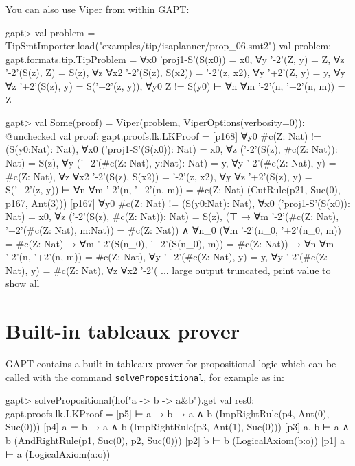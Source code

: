 \documentclass[a4paper,11pt]{book}
\begin{document}
You can also use Viper from within GAPT:
\begin{clilisting}
gapt> val problem = TipSmtImporter.load("examples/tip/isaplanner/prop_06.smt2")
val problem: gapt.formats.tip.TipProblem = ∀x0 'proj1-S'(S(x0)) = x0,
∀y '-2'(Z, y) = Z,
∀z '-2'(S(z), Z) = S(z),
∀z ∀x2 '-2'(S(z), S(x2)) = '-2'(z, x2),
∀y '+2'(Z, y) = y,
∀y ∀z '+2'(S(z), y) = S('+2'(z, y)),
∀y0 Z != S(y0)
⊢
∀n ∀m '-2'(n, '+2'(n, m)) = Z

gapt> val Some(proof) = Viper(problem, ViperOptions(verbosity=0)): @unchecked
val proof: gapt.proofs.lk.LKProof = [p168] ∀y0 #c(Z: Nat) != (S(y0:Nat): Nat),
∀x0 ('proj1-S'(S(x0)): Nat) = x0,
∀z ('-2'(S(z), #c(Z: Nat)): Nat) = S(z),
∀y ('+2'(#c(Z: Nat), y:Nat): Nat) = y,
∀y '-2'(#c(Z: Nat), y) = #c(Z: Nat),
∀z ∀x2 '-2'(S(z), S(x2)) = '-2'(z, x2),
∀y ∀z '+2'(S(z), y) = S('+2'(z, y))
⊢
∀n ∀m '-2'(n, '+2'(n, m)) = #c(Z: Nat)    (CutRule(p21, Suc(0), p167, Ant(3)))
[p167] ∀y0 #c(Z: Nat) != (S(y0:Nat): Nat),
∀x0 ('proj1-S'(S(x0)): Nat) = x0,
∀z ('-2'(S(z), #c(Z: Nat)): Nat) = S(z),
(⊤ → ∀m '-2'(#c(Z: Nat), '+2'(#c(Z: Nat), m:Nat)) = #c(Z: Nat)) ∧
    ∀n_0
    (∀m '-2'(n_0, '+2'(n_0, m)) = #c(Z: Nat) →
      ∀m '-2'(S(n_0), '+2'(S(n_0), m)) = #c(Z: Nat)) →
  ∀n ∀m '-2'(n, '+2'(n, m)) = #c(Z: Nat),
∀y '+2'(#c(Z: Nat), y) = y,
∀y '-2'(#c(Z: Nat), y) = #c(Z: Nat),
∀z ∀x2 '-2'( ... large output truncated, print value to show all

\end{clilisting}

\section{Built-in tableaux prover}

GAPT contains a built-in tableaux prover for propositional logic
which can be called with the command \texttt{solvePropositional}, for example as in:
\begin{clilisting}
gapt> solvePropositional(hof"a -> b -> a&b").get
val res0: gapt.proofs.lk.LKProof = [p5]  ⊢ a → b → a ∧ b    (ImpRightRule(p4, Ant(0), Suc(0)))
[p4] a ⊢ b → a ∧ b    (ImpRightRule(p3, Ant(1), Suc(0)))
[p3] a, b ⊢ a ∧ b    (AndRightRule(p1, Suc(0), p2, Suc(0)))
[p2] b ⊢ b    (LogicalAxiom(b:o))
[p1] a ⊢ a    (LogicalAxiom(a:o))

\end{clilisting}
\end{document}
